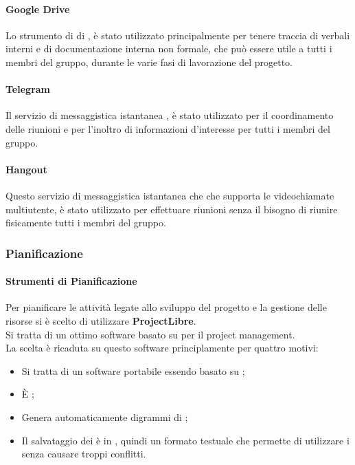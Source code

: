 \paragraph{Google Drive}
      Lo strumento di  di , è stato utilizzato principalmente per tenere traccia di verbali interni e di documentazione interna
      non formale, che può essere utile a tutti i membri del gruppo, durante le varie fasi di lavorazione del progetto.   

\paragraph{Telegram}   
	Il servizio di messaggistica istantanea , è stato utilizzato per il coordinamento delle riunioni e per l'inoltro di informazioni d'interesse per tutti i membri del gruppo.
   
\paragraph{Hangout}   
	Questo servizio di messaggistica istantanea che che supporta le videochiamate multiutente, è stato utilizzato per effettuare riunioni senza il bisogno di riunire fisicamente tutti i membri del gruppo.
   
    \subsubsection{Pianificazione}
      \paragraph{Strumenti di Pianificazione}
        Per pianificare le attività legate allo sviluppo del progetto e la gestione delle risorse si è scelto di utilizzare \textbf{ProjectLibre}.\\
        Si tratta di un ottimo software  basato su  per il project management.\\
        La scelta è ricaduta su questo software principlamente per quattro motivi:
        \begin{itemize}
          \item Si tratta di un software portabile essendo basato su ;
          \item È ;
          \item Genera automaticamente digrammi di ;
          \item Il salvataggio dei  è in , quindi un formato testuale che permette di utilizzare i  senza causare troppi conflitti.
        \end{itemize}
